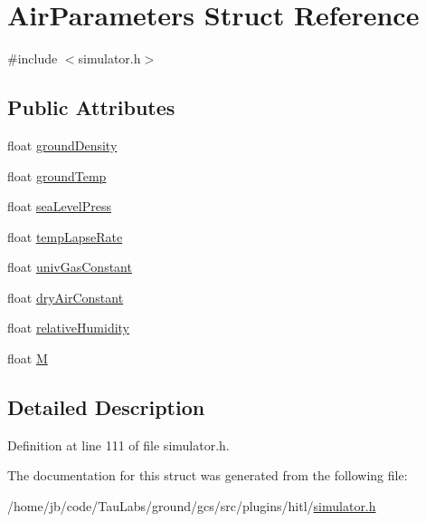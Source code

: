 \hypertarget{struct_air_parameters}{\section{\-Air\-Parameters \-Struct \-Reference}
\label{struct_air_parameters}
}


{\ttfamily \#include $<$simulator.\-h$>$}

\subsection*{\-Public \-Attributes}
\begin{DoxyCompactItemize}
\item 
float \hyperlink{group___h_i_t_l_plugin_ga450ddae855377cbc0ce591c7703bcf3f}{ground\-Density}
\item 
float \hyperlink{group___h_i_t_l_plugin_gab28b8a30520fdf84e924254a8e7f0167}{ground\-Temp}
\item 
float \hyperlink{group___h_i_t_l_plugin_gad886dc623ba9dd1cb06beeb950791c7a}{sea\-Level\-Press}
\item 
float \hyperlink{group___h_i_t_l_plugin_gae5608554d84c53cb81499d63b9381f9f}{temp\-Lapse\-Rate}
\item 
float \hyperlink{group___h_i_t_l_plugin_gaf6cf658bcff6f341c341ba3f6194761c}{univ\-Gas\-Constant}
\item 
float \hyperlink{group___h_i_t_l_plugin_ga343d7519080c3b70a59e554bfc2ed57d}{dry\-Air\-Constant}
\item 
float \hyperlink{group___h_i_t_l_plugin_ga259002c03d3dec62e3af14ded35e5bfd}{relative\-Humidity}
\item 
float \hyperlink{group___h_i_t_l_plugin_gaa24db2a922b9f638fdaacad6e3f4fb91}{\-M}
\end{DoxyCompactItemize}


\subsection{\-Detailed \-Description}


\-Definition at line 111 of file simulator.\-h.



\-The documentation for this struct was generated from the following file\-:\begin{DoxyCompactItemize}
\item 
/home/jb/code/\-Tau\-Labs/ground/gcs/src/plugins/hitl/\hyperlink{simulator_8h}{simulator.\-h}\end{DoxyCompactItemize}
